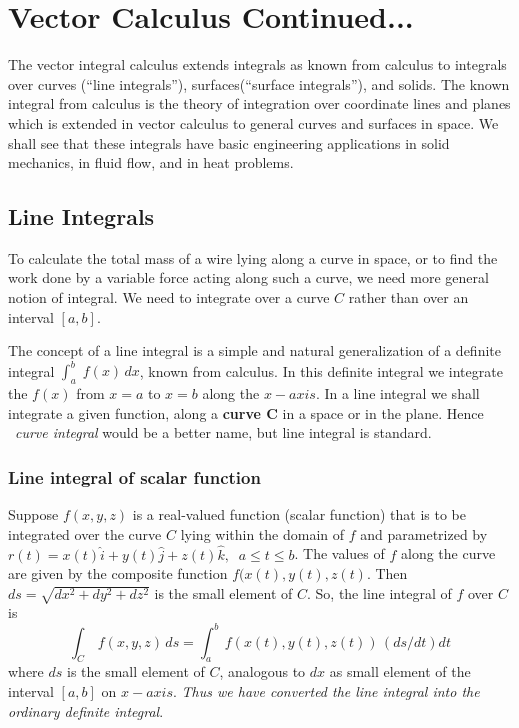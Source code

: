 \documentclass[aima331_lecturenotes_ku.tex]{subfiles}
\begin{document}
\chapter*{Vector Calculus Continued...}
The vector integral calculus extends integrals as known from calculus to integrals over curves (``line integrals''), surfaces(``surface integrals''), and solids. The known integral from calculus is the theory of integration over coordinate lines and planes which is extended in vector calculus to general curves and surfaces in space. We shall see that these integrals have basic engineering applications in solid mechanics, in fluid flow, and in heat problems.

\section{Line Integrals}
To calculate the total mass of a wire lying along a curve in space, or to find the work done by a variable force acting along such a curve, we need more general notion of integral. We need to integrate over a curve $C$ rather than over an interval $[a,b]$.

The concept of a line integral is a simple and natural generalization of a definite integral $\displaystyle \int_a^b \; f(x)\, dx$, known from calculus. In this definite integral we integrate the $f(x)$ from $x=a$ to $x=b$ along the $x-axis$. In a line integral we shall integrate a given function, along a \textbf{curve C} in a space or in the plane. Hence \
\textit{curve integral} would be a better name, but line integral is standard. \\

\subsection{Line integral of scalar function}
Suppose $f(x,y,z)$ is a real-valued function (scalar function) that is to be integrated over the curve $C$ lying within the domain of $f$ and parametrized by $r(t) = x(t)\hat{i}+y(t)\hat{j} + z(t)\hat{k}, \;\; a \leq t \leq b$. The values of $f$ along the curve are given by the composite function $f(x(t),y(t),z(t)$. Then $ds=\sqrt{dx^2 + dy^2 + dz^2}$ is the small element of $C$. So, the line integral of $f$ over $C$ is
\begin{equation}
  \label{line_scalar}
  \int_C\, f(x,y,z)\,ds =     \int_a^b\, f(x(t),y(t),z(t))\,(ds/dt) dt
\end{equation}
where $ds$ is the small element of $C$, analogous to $dx$ as small element of the interval $[a,b]$ on $x-axis$. \textit{Thus we have converted the line integral into the ordinary definite integral}.
\end{document}
